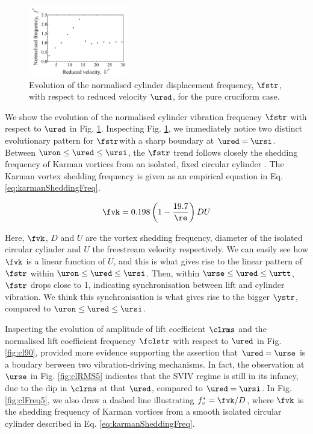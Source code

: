 \documentclass[a4paper,fleqn]{cas-sc}
\begin{document}
\begin{figure}
  \centering
  \includegraphics[width=0.38\textwidth]{figs/yStrFreq5}
  \caption{Evolution of the normalised cylinder displacement frequency, $\fstr$, with respect to reduced velocity $\ured$, for the pure cruciform case.}
  \label{fig:yStrFreq5}
\end{figure}

We show the evolution of the normalised cylinder vibration frequency $\fstr$ with respect to $\ured$ in Fig. \ref{fig:yStrFreq5}. Inspecting Fig. \ref{fig:yStrFreq5}, we immediately notice two distinct evolutionary pattern for $\fstr$with a sharp boundary at $\ured = \ursi$. Between $\uron \leq \ured \leq \ursi$, the $\fstr$ trend follows closely the shedding frequency of Karman vortices from an isolated, fixed circular cylinder \citep{Blevins1990}. The Karman vortex shedding frequency is given as an empirical equation in Eq. \ref{eq:karmanSheddingFreq}.

\begin{equation}
  \fvk = 0.198 \left( 1 - \frac{19.7}{\re} \right) DU
  \label{eq:karmanSheddingFreq}
\end{equation}

\noindent Here, $\fvk$, $D$ and $U$ are the vortex shedding frequency, diameter of the isolated circular cylinder and $U$ the freestream velocity respectively. We can easily see how $\fvk$ is a linear function of $U$, and this is what gives rise to the linear pattern of $\fstr$ within $\uron \leq \ured \leq \ursi$. Then, within $\urse \leq \ured \leq \urtt$, $\fstr$ drops close to 1, indicating synchronisation between lift and cylinder vibration. We think this synchronisation is what gives rise to the bigger $\ystr$, compared to $\uron \leq \ured \leq \ursi$.

Inspecting the evolution of \rms{} amplitude of lift coefficient $\clrms$ and the normalised lift coefficient frequency $\fclstr$ with respect to $\ured$ in Fig. \ref{fig:cl90}, provided more evidence supporting the assertion that $\ured = \urse$ is a boudary berween two vibration-driving mechanisms. In fact, the observation at $\urse$ in Fig. \ref{fig:clRMS5} indicates that the SVIV regime is still in its infancy, due to the dip in $\clrms$ at that $\ured$, compared to $\ured = \ursi$. In Fig. \ref{fig:clFreq5}, we also draw a dashed line illustrating $f^{*}_{v} = \fvk/D$, where $\fvk$ is the shedding frequency of Karman vortices from a smooth isolated circular cylinder described in Eq. \ref{eq:karmanSheddingFreq}.
\end{document}
